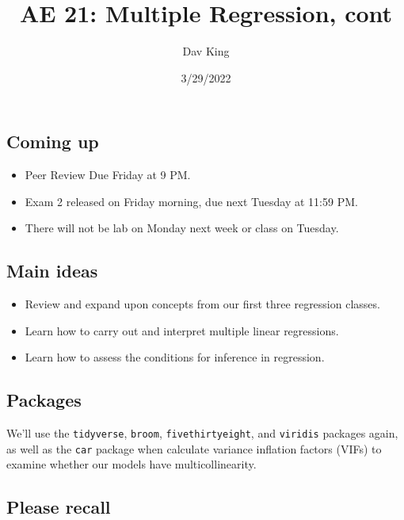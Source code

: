 \documentclass[
]{article}
\title{AE 21: Multiple Regression, cont}
\author{Dav King}
\date{3/29/2022}
\providecommand{\tightlist}{%
  \setlength{\itemsep}{0pt}\setlength{\parskip}{0pt}}
\begin{document}
\maketitle

\hypertarget{coming-up}{%
\subsection{Coming up}\label{coming-up}}

\begin{itemize}
\tightlist
\item
  Peer Review Due Friday at 9 PM.
\item
  Exam 2 released on Friday morning, due next Tuesday at 11:59 PM.
\item
  There will not be lab on Monday next week or class on Tuesday.
\end{itemize}

\hypertarget{main-ideas}{%
\subsection{Main ideas}\label{main-ideas}}

\begin{itemize}
\tightlist
\item
  Review and expand upon concepts from our first three regression
  classes.
\item
  Learn how to carry out and interpret multiple linear regressions.
\item
  Learn how to assess the conditions for inference in regression.
\end{itemize}

\hypertarget{packages}{%
\subsection{Packages}\label{packages}}

We'll use the \texttt{tidyverse}, \texttt{broom},
\texttt{fivethirtyeight}, and \texttt{viridis} packages again, as well
as the \texttt{car} package when calculate variance inflation factors
(VIFs) to examine whether our models have multicollinearity.

\hypertarget{please-recall}{%
\subsection{Please recall}\label{please-recall}}
\end{document}
